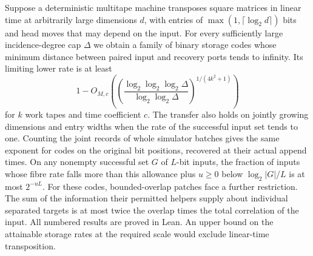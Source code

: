 Suppose a deterministic multitape machine transposes square matrices in
linear time at arbitrarily large dimensions $d$, with entries of
$\max(1,\lceil\log_2 d\rceil)$ bits and head moves that may depend on the input. For every sufficiently large incidence-degree
cap $\Delta$ we obtain a family of binary storage codes whose minimum
distance between paired input and recovery ports tends to infinity. Its
limiting lower rate is at least
\[
  1-O_{M,c}\!\left(
       \left(\frac{\log_2\log_2\log_2\Delta}{\log_2\log_2\Delta}\right)^{1/(4k^2+1)}
     \right)
\]
for $k$ work tapes and time coefficient $c$. The transfer also holds on
jointly growing dimensions and entry widths when the rate of the successful
input set tends to one. Counting the joint records of whole simulator
batches gives the same exponent for codes on the original bit positions,
recovered at their actual append times. On any nonempty successful set $G$ of $L$-bit inputs, the
fraction of inputs whose fibre rate falls more than this allowance plus
$u\ge0$ below $\log_2|G|/L$ is at most $2^{-uL}$. For these codes, bounded-overlap patches face a further
restriction. The sum of the information their permitted helpers supply about
individual separated targets is at most twice the overlap times the total
correlation of the input.
All numbered results are proved in Lean. An upper bound on the attainable
storage rates at the required scale would exclude linear-time transposition.
